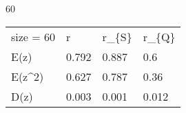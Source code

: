 
60
\begin{tabular}{llll}
\hline
 size = 60 & r     & r\_\{S\} & r\_\{Q\} \\
 E(z)      & 0.792 & 0.887 & 0.6   \\
 E(z\^{}2)    & 0.627 & 0.787 & 0.36  \\
 D(z)      & 0.003 & 0.001 & 0.012 \\
\hline
\end{tabular}